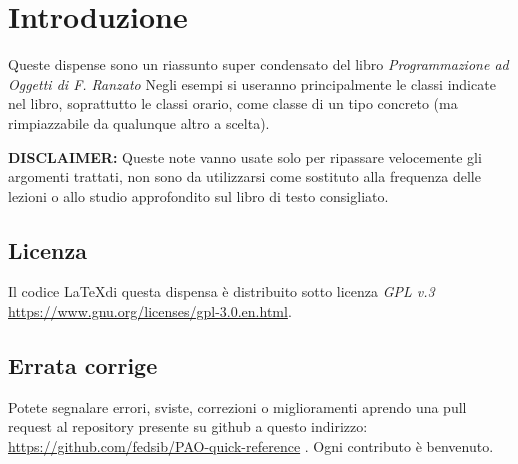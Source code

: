 \chapter{Introduzione}
Queste dispense sono un riassunto super condensato del libro \textit{Programmazione ad Oggetti di F. Ranzato}
Negli esempi si useranno principalmente le classi indicate nel libro, soprattutto le classi orario, come classe di un tipo concreto (ma rimpiazzabile da qualunque altro a scelta). 

\textbf{DISCLAIMER:} Queste note vanno usate solo per ripassare velocemente gli argomenti trattati, non sono da utilizzarsi come sostituto alla frequenza delle lezioni o allo studio approfondito sul libro di testo consigliato.

\section{Licenza}
Il codice \LaTeX di questa dispensa è distribuito sotto licenza \textit{GPL v.3} \url{https://www.gnu.org/licenses/gpl-3.0.en.html}.


\section{Errata corrige}

Potete segnalare errori, sviste, correzioni o miglioramenti aprendo una pull request al repository presente su github a questo indirizzo:
\url{https://github.com/fedsib/PAO-quick-reference} . Ogni contributo è benvenuto.